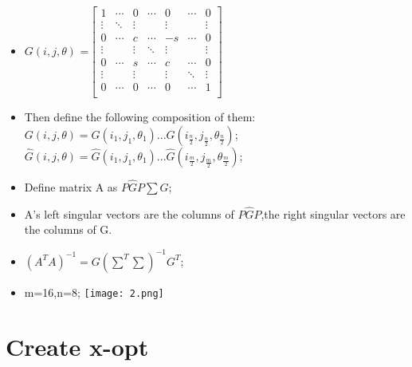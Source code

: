 \documentclass{beamer}
\begin{document}
\begin{frame}
	\begin{itemize}
			\item $G\left( i,j,\theta\right)$ =$\left[\begin{matrix}
						1  	   &\cdots	&0  	&\cdots  &0			&\cdots 	&0      \\
						\vdots &\ddots 	&\vdots &		 &\vdots	&			&\vdots  \\
 						0      &\cdots	&c  	&\cdots  &-s		&\cdots 	&0      \\
 						\vdots &		&\vdots &\ddots  &\vdots	&			&\vdots  \\
 						0      &\cdots	&s	 	&\cdots  &c			&\cdots 	&0      \\
 						\vdots &		&\vdots &		 &\vdots	&\ddots		&\vdots  \\
						0  	   &\cdots	&0  	&\cdots  &0			&\cdots 	&1      \\
				\end{matrix}\right]
				  $
			\item Then define the following composition of them:
				 $G\left(i,j,\theta\right)=G\left(i_1,j_1,\theta{_1} \right)...G\left(i_{\frac{n}{2}},j_{\frac{n}{2}},\theta{_\frac{n}{2}} \right) $;
				 $\widehat{G}\left(i,j,\theta\right)=\widehat{G}\left(i_1,j_1,\theta{_1} \right)...\widehat{G}\left(i_{\frac{m}{2}},j_{\frac{m}{2}},\theta{_\frac{m}{2}} \right)$;	
	\end{itemize}
\end{frame}

\begin{frame}
	\begin{itemize}
			\item Define matrix A as $P\widehat{G}P\sum G$;
			\item A's left singular vectors are the columns of $P\widehat{G}P$,the right singular vectors are the columns of G.
			\item $(A^T A)^{-1} = G(\sum^T\sum)^{-1}G^T$;				
	\end{itemize}
\end{frame}

\begin{frame}
	\begin{itemize}
		\item m=16,n=8;
		\texttt{[image: 2.png]} 		
	\end{itemize}
\end{frame}

\section{Create x-opt}
\begin{frame}
    \tableofcontents[currentsection]
\end{frame}
\end{document}
